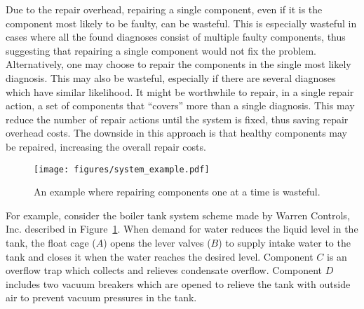 \documentclass[letterpaper]{article}
\begin{document}
Due to the repair overhead, repairing a single component, even if it is the component most likely to be faulty, can be wasteful. This is especially wasteful in cases where all the found diagnoses consist of multiple faulty components, thus suggesting that repairing a single component would not fix the problem. Alternatively, one may choose to repair the components in the single most likely diagnosis. This may also be wasteful, especially if there are several diagnoses which have similar likelihood. It might be worthwhile to repair, in a single repair action, a set of components that ``covers'' more than a single diagnosis. This may reduce the number of repair actions until the system is fixed, thus saving repair overhead costs. The downside in this approach is that healthy components may be repaired, increasing the overall repair costs.



\begin{figure}{}%
\begin{center}
  \texttt{[image: figures/system\_example.pdf]}
  \caption{An example where repairing components one at a time is wasteful.}
  \label{fig:simple-example}
\end{center}
\end{figure}
%
%
For example, consider the boiler tank system scheme made by Warren Controls, Inc. described in Figure~\ref{fig:simple-example}. When demand for water reduces the liquid level in the tank, the float cage ($A$) opens the lever valves ($B$) to supply intake water to the tank and closes it when the water reaches the desired level. Component $C$ is an overflow trap which collects and relieves condensate overflow. Component $D$ includes two vacuum breakers which are opened to relieve the tank with outside air to prevent vacuum pressures in the tank.
\end{document}
